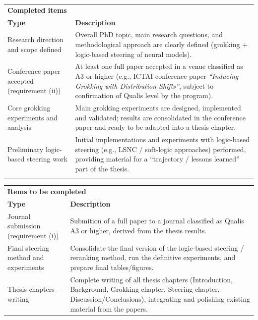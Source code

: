 \documentclass[../../infufrgs/ppgc-prop-tese.tex]{subfiles}
\begin{document}
\begin{table}[ht]
\centering
\small
\begin{tabular}{p{}p{}}
\hline
\multicolumn{2}{l}{\textbf{Completed items}} \\
\textbf{Type} & \textbf{Description} \\

\hline
Research direction and scope defined &
Overall PhD topic, main research questions, and methodological approach are clearly defined (grokking + logic-based steering of neural models). \\

Conference paper accepted (requirement (ii)) &
At least one full paper accepted in a venue classified as A3 or higher (e.g., ICTAI conference paper \emph{“Inducing Grokking with Distribution Shifts”}, subject to confirmation of Qualis level by the program). \\

Core grokking experiments and analysis &
Main grokking experiments are designed, implemented and validated; results are consolidated in the conference paper and ready to be adapted into a thesis chapter. \\

Preliminary logic-based steering work &
Initial implementations and experiments with logic-based steering (e.g., LSNC / soft-logic approaches) performed, providing material for a “trajectory / lessons learned” part of the thesis. \\
\hline
\vspace{1cm}
\end{tabular}

\begin{tabular}{p{}p{}}
\multicolumn{2}{l}{\textbf{Items to be completed}} \\
\textbf{Type} & \textbf{Description} \\
\hline
Journal submission (requirement (i)) &
Submition of a  full paper to a journal classified as Qualis A3 or higher, derived from the thesis results. \\

Final steering method and experiments &
Consolidate the final version of the logic-based steering / reranking method, run the definitive experiments, and prepare final tables/figures. \\

Thesis chapters – writing &
Complete writing of all thesis chapters (Introduction, Background, Grokking chapter, Steering chapter, Discussion/Conclusions), integrating and polishing existing material from the papers. \\


\end{tabular}
\end{table}
\end{document}

